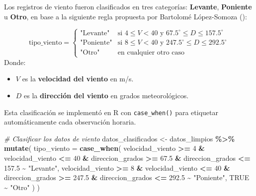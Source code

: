 \documentclass[
]{article}
\newenvironment{Shaded}{\begin{snugshade}}{\end{snugshade}}
\newcommand{\AttributeTok}[1]{\textcolor[rgb]{0.13,0.29,0.53}{#1}}
\newcommand{\CommentTok}[1]{\textcolor[rgb]{0.56,0.35,0.01}{\textit{#1}}}
\newcommand{\ConstantTok}[1]{\textcolor[rgb]{0.56,0.35,0.01}{#1}}
\newcommand{\DecValTok}[1]{\textcolor[rgb]{0.00,0.00,0.81}{#1}}
\newcommand{\FloatTok}[1]{\textcolor[rgb]{0.00,0.00,0.81}{#1}}
\newcommand{\FunctionTok}[1]{\textcolor[rgb]{0.13,0.29,0.53}{\textbf{#1}}}
\newcommand{\NormalTok}[1]{#1}
\newcommand{\OtherTok}[1]{\textcolor[rgb]{0.56,0.35,0.01}{#1}}
\newcommand{\SpecialCharTok}[1]{\textcolor[rgb]{0.81,0.36,0.00}{\textbf{#1}}}
\newcommand{\StringTok}[1]{\textcolor[rgb]{0.31,0.60,0.02}{#1}}
\providecommand{\tightlist}{%
  \setlength{\itemsep}{0pt}\setlength{\parskip}{0pt}}
\begin{document}
Los registros de viento fueron clasificados en tres categorías: \textbf{Levante}, \textbf{Poniente} u \textbf{Otro}, en base a la siguiente regla propuesta por Bartolomé López-Somoza ():

\[
\text{tipo\_viento} =
\begin{cases}
\text{"Levante"} & \text{si } 4 \leq V < 40 \text{ y } 67.5^\circ \leq D \leq 157.5^\circ \\
\text{"Poniente"} & \text{si } 8 \leq V < 40 \text{ y } 247.5^\circ \leq D \leq 292.5^\circ \\
\text{"Otro"} & \text{en cualquier otro caso}
\end{cases}
\]
Donde:

\begin{itemize}
\tightlist
\item
  \(V\) es la \textbf{velocidad del viento} en m/s.
\item
  \(D\) es la \textbf{dirección del viento} en grados meteorológicos.
\end{itemize}

Esta clasificación se implementó en R con \texttt{case\_when()} para etiquetar automáticamente cada observación horaria.

\begin{Shaded}
\begin{Highlighting}[]
\CommentTok{\# Clasificar los datos de viento}
\NormalTok{datos\_clasificados }\OtherTok{\textless{}{-}}\NormalTok{ datos\_limpios }\SpecialCharTok{\%\textgreater{}\%}
  \FunctionTok{mutate}\NormalTok{(}
    \AttributeTok{tipo\_viento =} \FunctionTok{case\_when}\NormalTok{(}
\NormalTok{      velocidad\_viento }\SpecialCharTok{\textgreater{}=} \DecValTok{4} \SpecialCharTok{\&}\NormalTok{ velocidad\_viento }\SpecialCharTok{\textless{}=} \DecValTok{40} \SpecialCharTok{\&}
\NormalTok{        direccion\_grados }\SpecialCharTok{\textgreater{}=} \FloatTok{67.5} \SpecialCharTok{\&}\NormalTok{ direccion\_grados }\SpecialCharTok{\textless{}=} \FloatTok{157.5} \SpecialCharTok{\textasciitilde{}} \StringTok{"Levante"}\NormalTok{,}
\NormalTok{      velocidad\_viento }\SpecialCharTok{\textgreater{}=} \DecValTok{8} \SpecialCharTok{\&}\NormalTok{ velocidad\_viento }\SpecialCharTok{\textless{}=} \DecValTok{40} \SpecialCharTok{\&}
\NormalTok{        direccion\_grados }\SpecialCharTok{\textgreater{}=} \FloatTok{247.5} \SpecialCharTok{\&}\NormalTok{ direccion\_grados }\SpecialCharTok{\textless{}=} \FloatTok{292.5} \SpecialCharTok{\textasciitilde{}} \StringTok{"Poniente"}\NormalTok{,}
      \ConstantTok{TRUE} \SpecialCharTok{\textasciitilde{}} \StringTok{"Otro"}
\NormalTok{    )}
\NormalTok{  )}
\end{Highlighting}
\end{Shaded}
\end{document}
